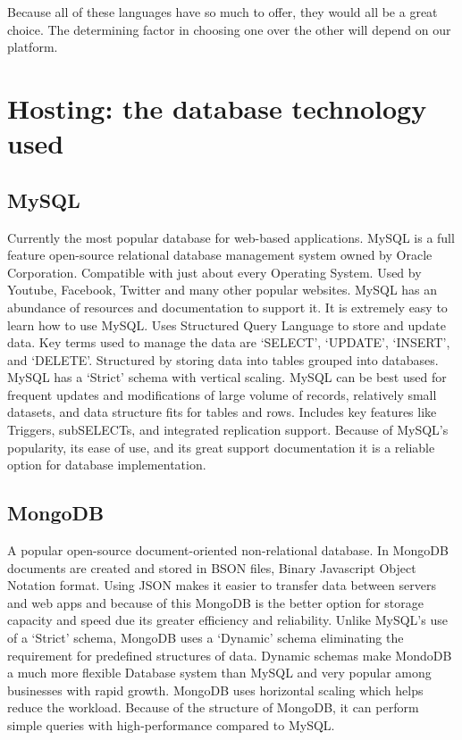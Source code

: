 \documentclass[onecolumn, draftclsnofoot,10pt, compsoc]{IEEEtran}
\begin{document}
    Because all of these languages have so much to offer, they would all be a great choice. The determining factor in choosing one over the other will depend on our platform.


\section{Hosting: the database technology used}

    \subsection{MySQL}
    Currently the most popular database for web-based applications. MySQL is a full feature
    open-source relational database management system owned by Oracle Corporation.
    Compatible with just about every Operating System. Used by Youtube, Facebook, Twitter
    and many other popular websites. MySQL has an abundance of resources and documentation
    to support it. It is extremely easy to learn how to use MySQL. Uses Structured Query
    Language to store and update data. Key terms used to manage the data are ‘SELECT’,
    ‘UPDATE’, ‘INSERT’, and ‘DELETE’. Structured by storing data into tables grouped into
    databases. MySQL has a ‘Strict’ schema with vertical scaling. MySQL can be best used
    for frequent updates and modifications of large volume of records, relatively small
    datasets, and data structure fits for tables and rows. Includes key features like
    Triggers, subSELECTs, and integrated replication support. Because of MySQL’s
    popularity, its ease of use, and its great support documentation it is a reliable
    option for database implementation.

    \subsection{MongoDB}
    A popular open-source document-oriented non-relational database. In MongoDB documents
    are created and stored in BSON files, Binary Javascript Object Notation format. Using
    JSON makes it easier to transfer data between servers and web apps and because of this
    MongoDB is the better option for storage capacity and speed due its greater efficiency
    and reliability. Unlike MySQL’s use of a ‘Strict’ schema, MongoDB uses a ‘Dynamic’
    schema eliminating the requirement for predefined structures of data. Dynamic schemas
    make MondoDB a much more flexible Database system than MySQL and very popular among
    businesses with rapid growth. MongoDB uses horizontal scaling which helps reduce the
    workload. Because of the structure of MongoDB, it can perform simple queries with
    high-performance compared to MySQL.
\end{document}
